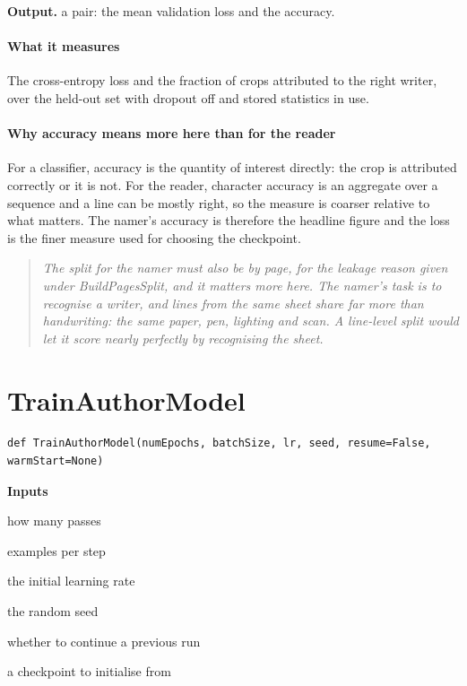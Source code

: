 \noindent\textbf{Output.} a pair: the mean validation loss and the accuracy.


\paragraph{What it measures}
The cross-entropy loss and the fraction of crops attributed to the right writer, over the held-out set with dropout off and stored statistics in use.


\paragraph{Why accuracy means more here than for the reader}
For a classifier, accuracy is the quantity of interest directly: the crop is attributed correctly or it is not. For the reader, character accuracy is an aggregate over a sequence and a line can be mostly right, so the measure is coarser relative to what matters. The namer's accuracy is therefore the headline figure and the loss is the finer measure used for choosing the checkpoint.


\begin{quote}\small\itshape The split for the namer must also be by page, for the leakage reason given under BuildPagesSplit, and it matters more here. The namer's task is to recognise a writer, and lines from the same sheet share far more than handwriting: the same paper, pen, lighting and scan. A line-level split would let it score nearly perfectly by recognising the sheet.\end{quote}

\section{TrainAuthorModel}
\begin{lstlisting}[style=sig]
def TrainAuthorModel(numEpochs, batchSize, lr, seed, resume=False, warmStart=None)
\end{lstlisting}

\noindent\textbf{Inputs}
\begin{description}[leftmargin=2.2em,style=nextline,font=\normalfont\ttfamily]\setlength\itemsep{1pt}
  \item[{numEpochs}] \normalfont how many passes
  \item[{batchSize}] \normalfont examples per step
  \item[{lr}] \normalfont the initial learning rate
  \item[{seed}] \normalfont the random seed
  \item[{resume}] \normalfont whether to continue a previous run
  \item[{warmStart}] \normalfont a checkpoint to initialise from
\end{description}

